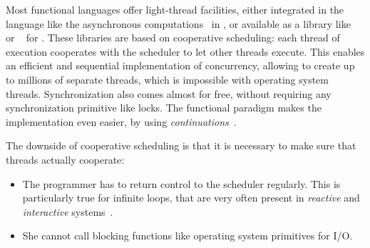 \documentclass[9pt,preprint]{sigplanconf}
\begin{document}

Most functional languages offer light-thread facilities, either integrated in the language like the asynchronous computations~\cite{Syme:2011} in \fsharp, or available as a library like \conhaskell~\cite{Jones:1996} or \lwt~\cite{Vouillon:2008} for \ocaml. These libraries are based on cooperative scheduling: each thread of execution cooperates with the scheduler to let other threads execute. This enables an efficient and sequential implementation of concurrency, allowing to create up to millions of separate threads, which is impossible with operating system threads. Synchronization also comes almost for free, without requiring any synchronization primitive like locks. The functional paradigm makes the implementation even easier, by using \emph{continuations}~\cite{Claessen:1999}.

The downside of cooperative scheduling is that it is necessary to make sure that threads actually cooperate:
\begin{itemize}
\item The programmer has to return control to the scheduler regularly. This is particularly true for infinite loops, that are very often present in \emph{reactive} and \emph{interactive} systems~\cite{Harel:1985}. 
\item She cannot call blocking functions like operating system primitives for I/O. 
\end{itemize}
\end{document}
